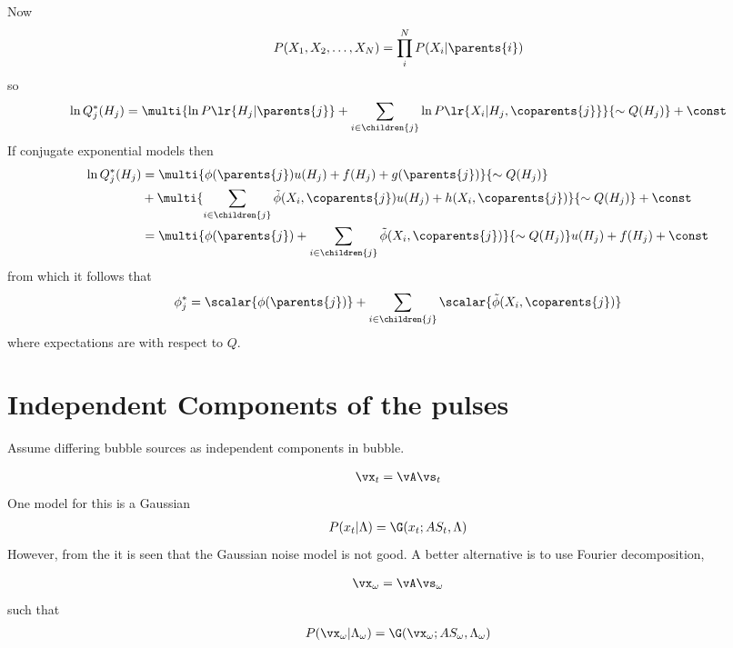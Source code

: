 {{Now 
\begin{align}
  P(X_1, X_2, \ldots, X_N) = \prod_i^N P(X_i|\parents{i})
\end{align}
 so 
 \begin{align}
 \ln Q^\ast_j(H_j) = \multi{\ln P\lr{H_j|\parents{j}} + \sum_{i \in  \children{j}} \ln P\lr{X_i| H_j, \coparents{j}}}{\sim Q(H_j)} + \const
 \end{align}
If conjugate exponential models then
\begin{align}
\ln Q^\ast_j(H_j) &= \multi{\phi(\parents{j}) u(H_j) + f(H_j) + g(\parents{j}) }{\sim Q(H_j)}
\nonumber \\
&+\multi{\sum_{i \in  \children{j}}  \tilde\phi(X_i,\coparents{j}) u(H_j) + h(X_i,\coparents{j})  }{\sim Q(H_j)} + \const\\
&= \multi{\phi(\parents{j}) + \sum_{i \in  \children{j}}  \tilde\phi(X_i,\coparents{j}) }{\sim Q(H_j)} u(H_j)+ f(H_j)+\const
\end{align}
from which it follows that
\begin{align}
  \phi^\ast_j = \scalar{\phi(\parents{j})} + \sum_{i \in  \children{j}}  \scalar{\tilde\phi(X_i,\coparents{j}) }
\end{align}
where expectations are with respect to $Q$.
}







\section{Independent Components of the pulses}

Assume differing bubble sources as independent components in bubble.

\begin{align}
\vx_t = \vA \vs_t
\end{align}
One model for this is a Gaussian
\begin{align}
  P(x_t| \Lambda) = \G(x_t; AS_t, \Lambda)
\end{align}
However,
from the \figref{} it is seen that the Gaussian noise model is not good.
A better alternative is to use Fourier decomposition,

\begin{align}
  \vx_\omega = \vA \vs_\omega
\end{align}
such that
\begin{align}
  P(\vx_\omega| \Lambda_\omega) = \G( \vx_\omega ; AS_\omega, \Lambda_\omega)
\end{align}

}
